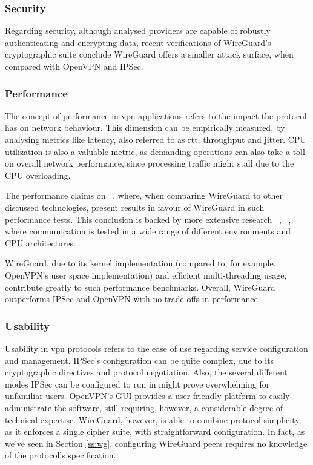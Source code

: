\documentclass[11pt,twoside,a4paper]{report}
\begin{document}
\subsubsection{Security}

Regarding security, although analysed providers are capable of robustly authenticating and encrypting data, recent verifications of WireGuard's cryptographic suite \cite{lipp2019mechanised, dowling2018cryptographic} conclude WireGuard offers a smaller attack surface, when compared with OpenVPN and IPSec.

\subsubsection{Performance}

The concept of performance in \ac{vpn} applications refers to the impact the protocol has on network behaviour. This dimension can be empirically measured, by analysing metrics like latency, also referred to as \ac{rtt}, throughput and jitter. CPU utilization is also a valuable metric, as demanding operations can also take a toll on overall network performance, since processing traffic might stall due to the CPU overloading.

The performance claims on ~\cite{donenfeld2017wireguard}, where, when comparing WireGuard to other discussed technologies, present results in favour of WireGuard in such performance tests. This conclusion is backed by more extensive research ~\cite{mackey2020performance}, ~\cite{osswald2020performance}, where communication is tested in a wide range of different environments and CPU architectures.

WireGuard, due to its kernel implementation (compared to, for example, OpenVPN's user space implementation) and efficient multi-threading usage, contribute greatly to such performance benchmarks. Overall, WireGuard outperforms IPSec and OpenVPN with no trade-offs in performance.

\subsubsection{Usability}

Usability in \ac{vpn} protocols refers to the ease of use regarding service configuration and management. IPSec's configuration can be quite complex, due to its cryptographic directives and protocol negotiation. Also, the several different modes IPSec can be configured to run in might prove overwhelming for unfamiliar users. OpenVPN's GUI provides a user-friendly platform to easily administrate the software, still requiring, however, a considerable degree of technical expertise. WireGuard, however, is able to combine protocol simplicity, as it enforces a single cipher suite, with straightforward configuration. In fact, as we've seen in Section \ref{ss:wg}, configuring WireGuard peers requires no knowledge of the protocol's specification.
\end{document}

